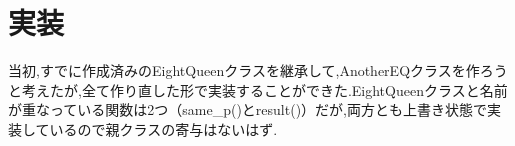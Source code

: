 \documentclass[uplatex,dvipdfmx,a4paper,11pt,oneside,openany]{jsbook}
\begin{document}
\section{実装}


当初,すでに作成済みのEightQueenクラスを継承して,AnotherEQクラスを作ろうと考えたが,全て作り直した形で実装することができた.EightQueenクラスと名前が重なっている関数は2つ（same\_p()とresult()）だが,両方とも上書き状態で実装しているので親クラスの寄与はないはず.
\end{document}
